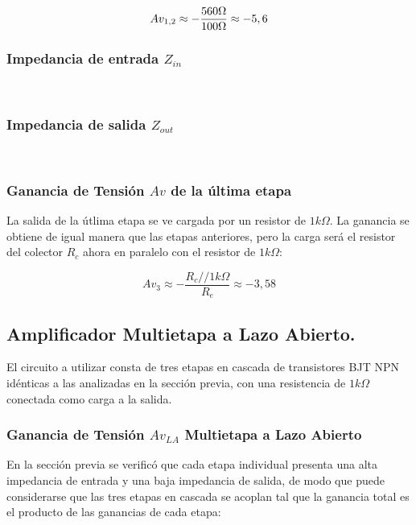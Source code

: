 \documentclass[letterpaper, 10 pt, conference]{ieeeconf}  %
\begin{document}
\begin{equation}
Av_{1,2} \approx -\frac{560\Omega}{100\Omega} \approx -5,6 \\[1em]
\end{equation}

\subsubsection{Impedancia de entrada $Z_{in}$}\\

\subsubsection{Impedancia de salida $Z_{out}$}\\

\subsubsection{Ganancia de Tensión $Av$ de la última etapa}
La salida de la útlima etapa se ve cargada por un resistor de $1k\Omega$. La ganancia se obtiene de igual manera que las etapas anteriores, pero la carga será el resistor del colector $R_c$ ahora en paralelo con el resistor de $1k\Omega$:

\begin{equation}
Av_3 \approx -\frac{R_c//1k\Omega}{R_e} \approx -3,58
\end{equation}

\subsection{\textbf{Amplificador Multietapa a Lazo Abierto.}}
El circuito a utilizar consta de tres etapas en cascada de transistores BJT NPN idénticas a las analizadas en la sección previa, con una resistencia de $1k\Omega$ conectada como carga a la salida.\\

\subsubsection{Ganancia de Tensión $Av_{LA}$ Multietapa a Lazo Abierto}

En la sección previa se verificó que cada etapa individual presenta una alta impedancia de entrada y una baja impedancia de salida, de modo que puede considerarse que las tres etapas en cascada se acoplan tal que la ganancia total es el producto de las ganancias de cada etapa:\\
\end{document}
